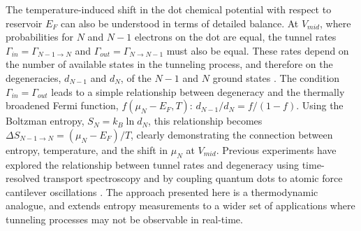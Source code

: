 \documentclass[twocolumn,showpacs,amsmath,amssymb,prl,aps,superscriptaddress]{revtex4-1}
\begin{document}
The temperature-induced shift in the dot chemical potential with respect to reservoir $E_F$ can also be understood in terms of detailed balance.  At $V_{mid}$, where probabilities for $N$ and $N-1$ electrons on the dot are equal, the tunnel rates $\Gamma_{in}=\Gamma_{N-1\rightarrow N}$ and $\Gamma_{out}=\Gamma_{N\rightarrow N-1}$ must also be equal. These rates depend on the number of available states in the tunneling process, and therefore on the degeneracies, $d_{N-1}$ and $d_{N}$, of the $N-1$ and $N$ ground states \cite{Beenakker1991, Gustavsson2009}.  The condition $\Gamma_{in} = \Gamma_{out}$ leads to a simple relationship between degeneracy and the thermally broadened Fermi function, $f(\mu_{N}-E_{F}, T)$: $d_{N-1}/d_{N}=f/(1-f)$. Using the Boltzman entropy, $S_{N}=k_{B} \ln{d_N}$, this relationship becomes $\Delta S_{N-1\rightarrow N}= (\mu_{N}-E_F)/T$, clearly demonstrating the connection between entropy, temperature, and the shift in $\mu_N$ at $V_{mid}$. Previous experiments have explored the relationship between tunnel rates and degeneracy using time-resolved transport spectroscopy and by coupling quantum dots to atomic force cantilever oscillations \cite{Cockins2010, Bennett2010, Beckel2014, Hofmann2016}. The approach presented here is a thermodynamic analogue, and extends entropy measurements to a wider set of applications where tunneling processes may not be observable in real-time.
\end{document}
